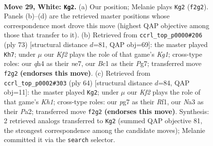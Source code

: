 \documentclass[11pt]{article}
\begin{document}
\clearpage

\begin{figure}[p]\centering
\begin{subfigure}{0.46\textwidth}\centering
\resizebox{\linewidth}{!}{%
\newchessgame
\chessboard[
  setfen={4Q1nr/1kr3p1/8/2p3Pp/5P1q/N1P5/PP3K2/R1B5 w - - 0 29},
  showmover=false,
  pgfstyle=straightmove, color=movearrow, markmove={f2-g2}
]}
\caption{}
\end{subfigure}\hfill
\begin{subfigure}{0.46\textwidth}\centering
\resizebox{\linewidth}{!}{%
\newchessgame
\chessboard[
  setfen={1q4k1/2R1N1p1/r4pb1/4p2p/1P5P/3r1Q2/5PP1/1R4K1 b - - 13 37},
  showmover=false,
  pgfstyle=straightmove, color=movearrow, markmove={g8-h7}
]}
\caption{}
\end{subfigure}
\\[4pt]
\begin{subfigure}{0.46\textwidth}\centering
\resizebox{\linewidth}{!}{%
\newchessgame
\chessboard[
  setfen={5rk1/1p4p1/8/b1QP1p2/p1P5/3q1P1N/P6P/5R1K w - - 1 33},
  showmover=false,
  pgfstyle=straightmove, color=movearrow, markmove={h1-g2}
]}
\caption{}
\end{subfigure}\hfill

\caption{\textbf{Move 29, White: \texttt{Kg2}.} (a) Our position; Melanie plays \texttt{Kg2} (\texttt{f2g2}). Panels (b)--(d) are the retrieved master positions whose correspondence most drove this move (highest QAP objective among those that transfer to it). (b) Retrieved from \texttt{ccrl\_top\_p0000\#206} (ply 73) [structural distance $d$=81, QAP obj=69]: the master played \texttt{Kh7}; under $\mu$ our \emph{Kf2} plays the role of that game's \emph{Kg1}; cross-type roles: our \emph{q}h4 as their \emph{n}e7, our \emph{B}c1 as their \emph{P}g7; transferred move \texttt{f2g2} \textbf{(endorses this move)}. (c) Retrieved from \texttt{ccrl\_top\_p0002\#303} (ply 64) [structural distance $d$=84, QAP obj=11]: the master played \texttt{Kg2}; under $\mu$ our \emph{Kf2} plays the role of that game's \emph{Kh1}; cross-type roles: our \emph{p}g7 as their \emph{R}f1, our \emph{N}a3 as their \emph{P}a2; transferred move \texttt{f2g2} \textbf{(endorses this move)}. Synthesis: 2 retrieved analogs transferred to \texttt{Kg2} (summed QAP objective 81, the strongest correspondence among the candidate moves); Melanie committed it via the \texttt{search} selector.}
\label{fig:thought-m56}
\end{figure}

\clearpage
\end{document}
